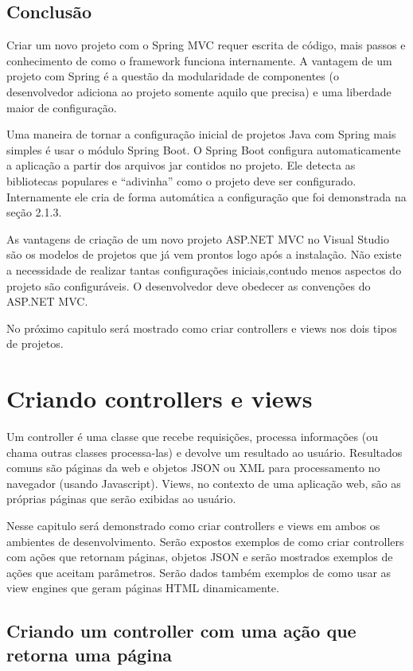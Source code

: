 \documentclass[a4paper,12pt]{article}
\begin{document}
\subsection{Conclusão}

Criar um novo projeto com o Spring MVC requer escrita de código, mais passos e conhecimento de como o framework funciona internamente. A vantagem de um projeto com Spring é a questão da modularidade de componentes (o desenvolvedor adiciona ao projeto somente aquilo que precisa) e uma liberdade maior de configuração.

Uma maneira de tornar a configuração inicial de projetos Java com Spring mais simples é usar o módulo Spring Boot. O Spring Boot configura automaticamente a aplicação a partir dos arquivos jar contidos no projeto. Ele detecta as bibliotecas populares e “adivinha” como o projeto deve ser configurado. Internamente ele cria de forma automática a configuração que foi demonstrada na seção 2.1.3.

As vantagens de criação de um novo projeto ASP.NET MVC no Visual Studio são os modelos de projetos que já vem prontos logo após a instalação. Não existe a necessidade de realizar tantas configurações iniciais,contudo menos aspectos do projeto são configuráveis. O desenvolvedor deve obedecer as convenções do ASP.NET MVC.

No próximo capitulo será mostrado como criar controllers e views nos dois tipos de projetos.

\newpage
\section{Criando controllers e views}

Um controller é uma classe que  recebe requisições, processa informações (ou chama outras classes processa-las) e devolve um resultado ao usuário. Resultados comuns são páginas da web e objetos JSON ou XML para processamento no navegador (usando Javascript). Views, no contexto de uma aplicação web, são as próprias páginas que serão exibidas ao usuário.

Nesse capitulo será demonstrado como criar controllers e views em ambos os ambientes de desenvolvimento. Serão expostos exemplos de como criar controllers com ações que retornam páginas, objetos JSON e serão mostrados exemplos de ações que aceitam parâmetros. Serão dados também exemplos de como usar as view engines que geram páginas HTML dinamicamente.

\subsection{Criando um controller com uma ação que retorna uma página}
\end{document}
